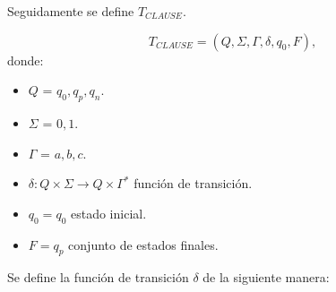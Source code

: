 \documentclass[12pt]{article}
\begin{document}
Seguidamente se define $T_{CLAUSE}$.

\[
    T_{CLAUSE} = (Q, {\Sigma}, \Gamma, \delta, q_{0}, F),
\]
donde:
\begin{itemize}
    \item \(Q\) = ${q_0,q_p,q_n}$.
    \item \(\Sigma\) = ${0,1}$.
    \item \(\Gamma\) = ${a,b,c}$.
    \item \(\delta: Q \times \Sigma \to Q \times \Gamma^*\) función de transición.
    \item \(q_{0} = q_0\) estado inicial.
    \item \(F={q_p}\) conjunto de estados finales.
\end{itemize}

Se define la función de transición $\delta$ de la siguiente manera:
\end{document}
